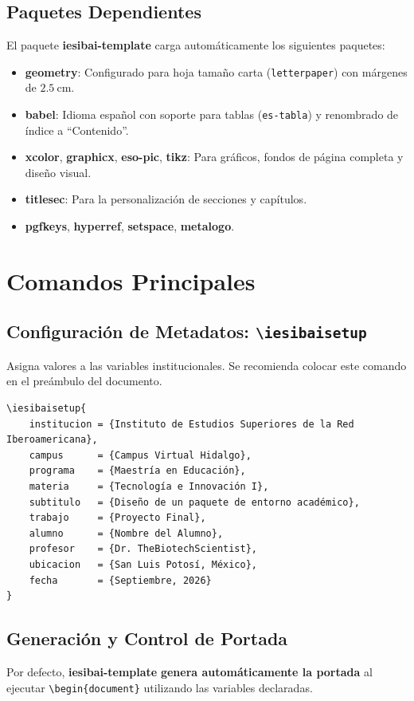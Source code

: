 \documentclass[11pt,a4paper]{article}
\newcommand{\pkg}[1]{\textbf{#1}}
\newcommand{\cmd}[1]{\texttt{\textbackslash#1}}
\begin{document}
\subsection{Paquetes Dependientes}
El paquete \pkg{iesibai-template} carga automáticamente los siguientes paquetes:
\begin{itemize}
    \item \pkg{geometry}: Configurado para hoja tamaño carta (\texttt{letterpaper}) con márgenes de $2.5\ \text{cm}$.
    \item \pkg{babel}: Idioma español con soporte para tablas (\texttt{es-tabla}) y renombrado de índice a "`Contenido"'.
    \item \pkg{xcolor}, \pkg{graphicx}, \pkg{eso-pic}, \pkg{tikz}: Para gráficos, fondos de página completa y diseño visual.
    \item \pkg{titlesec}: Para la personalización de secciones y capítulos.
    \item \pkg{pgfkeys}, \pkg{hyperref}, \pkg{setspace}, \pkg{metalogo}.
\end{itemize}

\section{Comandos Principales}

\subsection{Configuración de Metadatos: \cmd{iesibaisetup}}
Asigna valores a las variables institucionales. Se recomienda colocar este comando en el preámbulo del documento.

\begin{lstlisting}
\iesibaisetup{
    institucion = {Instituto de Estudios Superiores de la Red Iberoamericana},
    campus      = {Campus Virtual Hidalgo},
    programa    = {Maestría en Educación},
    materia     = {Tecnología e Innovación I},
    subtitulo   = {Diseño de un paquete de entorno académico},
    trabajo     = {Proyecto Final},
    alumno      = {Nombre del Alumno},
    profesor    = {Dr. TheBiotechScientist},
    ubicacion   = {San Luis Potosí, México},
    fecha       = {Septiembre, 2026}
}
\end{lstlisting}

\subsection{Generación y Control de Portada}
Por defecto, \pkg{iesibai-template} \textbf{genera automáticamente la portada} al ejecutar \texttt{\textbackslash begin\{document\}} utilizando las variables declaradas.
\end{document}
